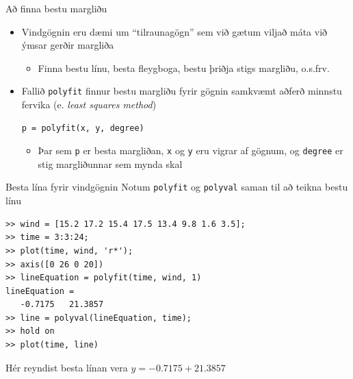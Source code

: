 \documentclass{beamer}
\begin{document}
\begin{frame}[fragile]{Að finna bestu margliðu}
\begin{itemize}
 \item Vindgögnin eru dæmi um ``tilraunagögn'' sem við gætum viljað máta við ýmsar gerðir margliða
 \begin{itemize}
  \item Finna bestu línu, besta fleygboga, bestu þriðja stigs margliðu, o.s.frv.
 \end{itemize}
 \item Fallið \texttt{polyfit} finnur bestu margliðu fyrir gögnin samkvæmt aðferð minnstu fervika (e. \emph{least squares method})
\begin{verbatim}
p = polyfit(x, y, degree)
\end{verbatim}
\begin{itemize}
 \item Þar sem \texttt{p} er besta margliðan, \texttt{x} og \texttt{y} eru vigrar af gögnum, og \texttt{degree} er stig margliðunnar sem mynda skal
\end{itemize}
\end{itemize}
\end{frame}

\begin{frame}[fragile]{Besta lína fyrir vindgögnin}
\vspace{\baselineskip}
Notum \texttt{polyfit} og \texttt{polyval} saman til að teikna bestu línu
\begin{verbatim}
>> wind = [15.2 17.2 15.4 17.5 13.4 9.8 1.6 3.5];
>> time = 3:3:24;
>> plot(time, wind, 'r*');
>> axis([0 26 0 20])
>> lineEquation = polyfit(time, wind, 1)
lineEquation =
   -0.7175   21.3857
>> line = polyval(lineEquation, time);
>> hold on
>> plot(time, line)
\end{verbatim}
Hér reyndist besta línan vera $y = -0.7175 + 21.3857$
\end{frame}
\end{document}
